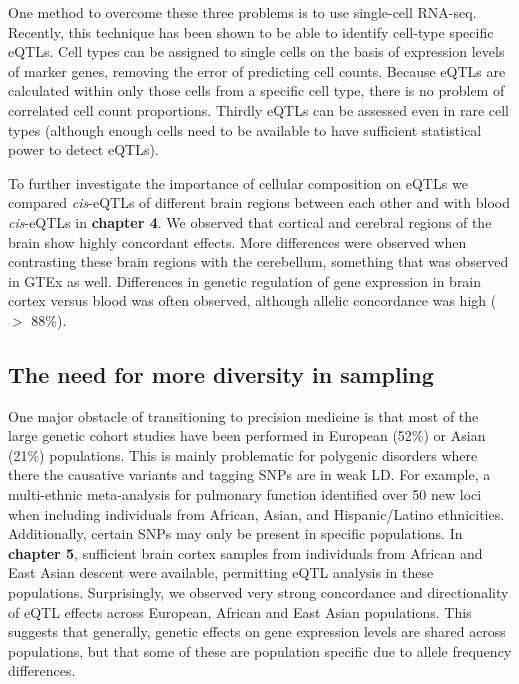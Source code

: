 One method to overcome these three problems is to use single-cell RNA-seq\cite{tangMRNASeqWholetranscriptomeAnalysis2009}. Recently, this technique has been shown to be able to identify cell-type specific eQTLs\cite{vanderwijstSinglecellRNASequencing2018b}. Cell types can be assigned to single cells on the basis of expression levels of marker genes, removing the error of predicting cell counts. Because eQTLs are calculated within only those cells from a specific cell type, there is no problem of correlated cell count proportions. Thirdly eQTLs can be assessed even in rare cell types (although enough cells need to be available to have sufficient statistical power to detect eQTLs).

To further investigate the importance of cellular composition on eQTLs we compared \emph{cis}-eQTLs of different brain regions between each other and with blood \emph{cis}-eQTLs in \textbf{chapter 4}. We observed that cortical and cerebral regions of the brain show highly concordant effects. More differences were observed when contrasting these brain regions with the cerebellum, something that was observed in  GTEx as well\cite{GTExConsortiumAtlas}. Differences in genetic regulation of gene expression in brain cortex versus blood was often observed, although allelic concordance was high ($>$ 88\%).

\subsection{The need for more diversity in sampling}
One major obstacle of transitioning to precision medicine is that most of the large genetic cohort studies have been performed in European (52\%) or Asian (21\%) populations\cite{sirugoMissingDiversityHuman2019}. This is mainly problematic for polygenic disorders where there the causative variants and tagging SNPs are in weak LD\cite{sirugoMissingDiversityHuman2019}. For example, a multi-ethnic meta-analysis for pulmonary function identified over 50 new loci when including individuals from African, Asian, and Hispanic/Latino ethnicities\cite{wyssMultiethnicMetaanalysisIdentifies2018}.  Additionally, certain SNPs may only be present in specific populations\cite{adalsteinsdottirberglindNationwideStudyHypertrophic2014}.  In \textbf{chapter 5}, sufficient brain cortex samples from individuals from African and East Asian descent were available, permitting eQTL analysis in these populations. Surprisingly, we observed very strong concordance and directionality of eQTL effects across European, African and East Asian populations. This suggests that generally, genetic effects on gene expression levels are shared across populations, but that some of these are population specific due to allele frequency differences.

